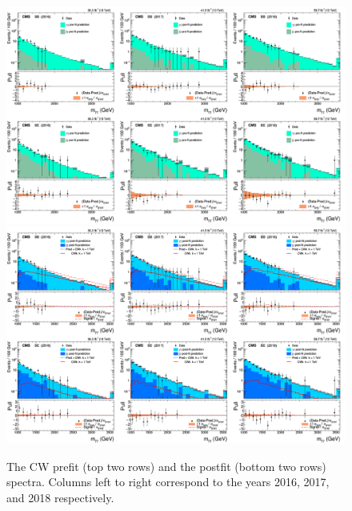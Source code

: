 \begin{figure}[h!]\centering
\includegraphics[width=1.\linewidth]{fig/PRED_PRE_CWk_real.png}
\includegraphics[width=1.\linewidth]{fig/PRED_POST_CWk_real.png}
\caption{The CW prefit (top two rows) and the postfit (bottom two rows) \mgg spectra.
Columns left to right correspond to the years 2016, 2017, and 2018 respectively. }
\label{Fig:Postift_mgg_Clockwork_real}
\end{figure}

